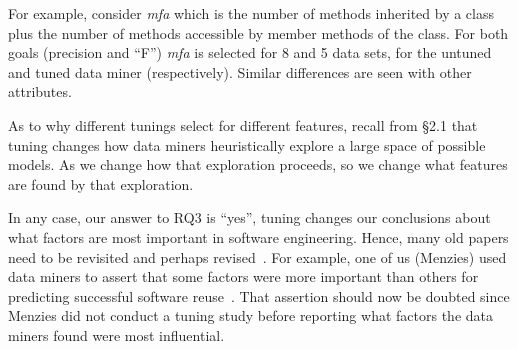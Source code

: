\documentclass[final,twocolumn,5p]{elsarticle}
\begin{document}
For example, consider {\em mfa} which is the
number of methods inherited by a class plus the number of methods accessible by member methods of the class.
For both goals (precision and ``F'') {\em mfa} is selected for 8 and 5 data sets,
for the untuned and tuned data miner (respectively).
Similar differences are   seen with other attributes.


As to why different tunings select for different features,  recall from {\S}2.1 that tuning changes how data miners
heuristically explore a large space of possible models. As we change how that exploration proceeds,
so we change what features are found by that exploration.

In any case, our answer to RQ3 is ``yes'', tuning changes our
conclusions about what factors are most important in software engineering.
Hence, many old papers    need to be revisited  and perhaps revised~\cite{bell2013limited,rahman2013how,me02k,Moser:2008,zimmermann2007predicting,herzig2013predicting}.  
For example, one of us (Menzies) used data miners
to assert that some factors were more important than others for predicting
successful software reuse~\cite{me02k}. That assertion should now be doubted since Menzies did not conduct a tuning study before reporting what factors the data miners
found were most influential.
\end{document}
